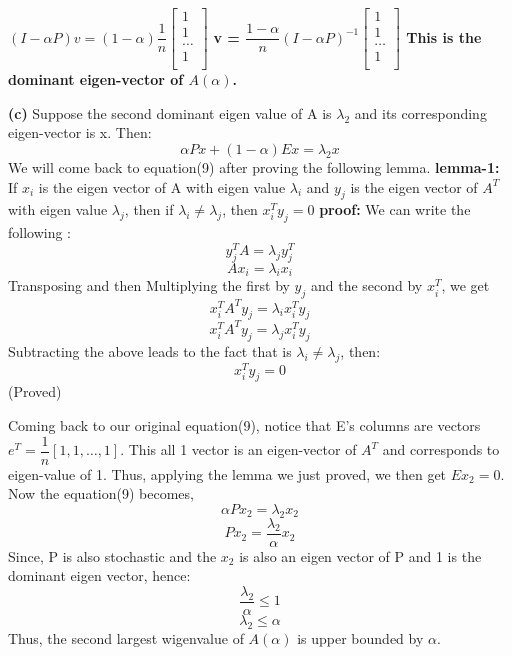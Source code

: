 \documentclass{article}
\renewcommand\part[1]{\vspace{.10in}\textbf{(#1)}}
\begin{document}
  $(I - \alpha P)v = (1 - \alpha)\dfrac{1}{n} \begin{bmatrix}
	  			   1 \\
	  			   1 \\
	  			   \dots \\
	  			   1 \\
	  			 \end{bmatrix}$ \newline
  \bf v = $\dfrac{1-\alpha}{n} (I - \alpha P)^{-1}\begin{bmatrix}
	  			   1 \\
	  			   1 \\
	  			   \dots \\
	  			   1 \\
  \end{bmatrix}$ \textbf {This is the dominant eigen-vector of $A(\alpha)$}. \newline

  \part{c} Suppose the second dominant eigen value of A is $\lambda_2$ and its corresponding eigen-vector is x. Then: 
  \begin{equation}
	  \alpha Px + (1-\alpha)Ex = \lambda_2 x
  \end{equation}
  We will come back to equation(9) after proving the following lemma. \newline
  \textbf {lemma-1:} If $x_i$ is the eigen vector of A with eigen value $\lambda_i$ and $y_j$ is the eigen vector of $A^T$ with eigen value $\lambda_j$, then if $\lambda_i \neq \lambda_j$, then $x_{i}^Ty_j = 0$ \newline
  \textbf {proof:} We can write the following :
  \[ y_{j}^TA = \lambda_{j}y_{j}^T \]
  \[ Ax_{i} = \lambda_{i}x_{i}\]
  Transposing and then Multiplying the first by $y_j$ and the second by $x_{i}^T$, we get
  \[ x_{i}^TA^Ty_j = \lambda_ix_{i}^Ty_j\]
  \[ x_{i}^TA^Ty_j = \lambda_jx_{i}^Ty_j\]
  Subtracting the above leads to the fact that is $\lambda_i \neq \lambda_j$, then:
  \[x_{i}^Ty_{j} = 0\]
  (Proved) \newline

  Coming back to our original equation(9), notice that E's columns are vectors $e^T=\dfrac{1}{n}[1,1, \dots, 1]$. This all 1 vector is an eigen-vector of $A^T$ and corresponds to eigen-value of 1. Thus, applying the lemma we just proved, we then get $Ex_2=0$. Now the equation(9) becomes, 
  \[\alpha Px_2 = \lambda_2 x_2 \]
  \[Px_2 = \dfrac{\lambda_2}{\alpha }x_2\]
  Since, P is also stochastic and the $x_2$ is also an eigen vector of P and 1 is the dominant eigen vector, hence: \newline
  \[\dfrac{\lambda_2}{\alpha} \leq 1\]
  \[\lambda_2 \leq \alpha\]
  Thus, the second largest wigenvalue of $A(\alpha)$ is upper bounded by $\alpha$. \newline
\end{document}
